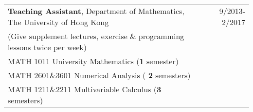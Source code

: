 \begin{longtable}{Xr}

 {\bf Teaching Assistant},  Department of Mathematics, The University of Hong Kong & 9/2013-2/2017\\
  (Give supplement lectures, exercise \& programming lessons twice per week) & \\
MATH 1011 University Mathematics ({\bf 1} semester) & \\
MATH 2601\&3601 Numerical Analysis ( {\bf 2} semesters) & \\
MATH 1211\&2211 Multivariable Calculus ({\bf 3} semesters) & \\
\end{longtable}

